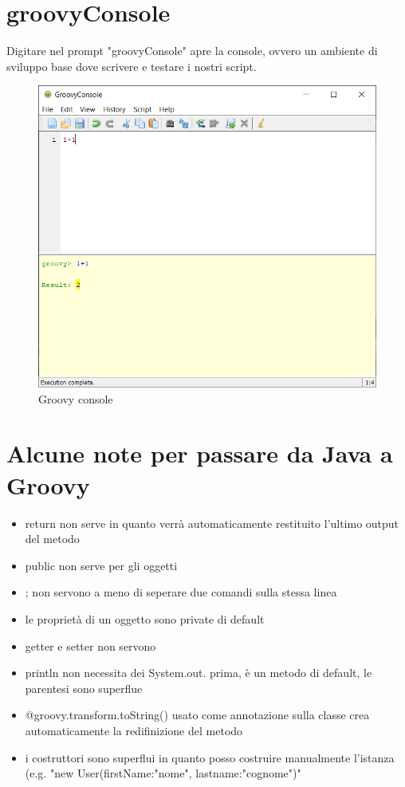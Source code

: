 \documentclass[11pt,a4paper]{book}
\begin{document}
\section{groovyConsole}
Digitare nel prompt "groovyConsole" apre la console, ovvero un ambiente di sviluppo base dove scrivere e testare i nostri script.
\begin{figure}[h!]
	\begin{center}
		\includegraphics[scale=0.6]{img/001.png}
		\caption{Groovy console}
		\label{fig: 001}
	\end{center}
\end{figure}

\section{Alcune note per passare da Java a Groovy}
\begin{itemize}
	\item return non serve in quanto verrà automaticamente restituito l'ultimo output del metodo
	\item public non serve per gli oggetti
	\item ; non servono a meno di seperare due comandi sulla stessa linea
	\item le proprietà di un oggetto sono private di default
	\item getter e setter non servono
	\item println non necessita dei System.out. prima, è un metodo di default, le parentesi sono superflue
	\item @groovy.transform.toString() usato come annotazione sulla classe crea automaticamente la redifinizione del metodo
	\item i costruttori sono superflui in quanto posso costruire manualmente l'istanza (e.g. "new User(firstName:"nome", lastname:"cognome")"
\end{itemize}
\end{document}
